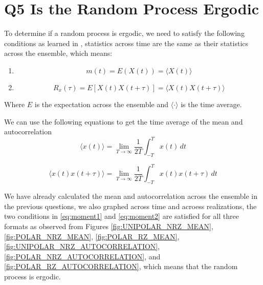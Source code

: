 \chapter[Q5 Is the Random Process Ergodic]{Q5 Is the Random Process Ergodic}
\label{cp:q5-is-the-random-process-ergodic}

To determine if a random process is ergodic, we need to satisfy the following
conditions as learned in \cite{DigitalCommunicationsLecture4}, statistics across time are the same
as their statistics across the ensemble, which means:
\begin{enumerate}
    \item \begin{equation}
              \label{eq:moment1}
              m(t) = E(X(t)) = \langle X(t) \rangle
          \end{equation}

    \item \begin{equation}
              \label{eq:moment2}
              R_x(\tau) = E[X(t) X(t + \tau)] = \langle X(t) X(t + \tau) \rangle
          \end{equation}
\end{enumerate}

Where $E$ is the expectation across the ensemble and $\langle \cdot \rangle$ is
the time average.

We can use the following equations to get the time average of the mean and
autocorrelation
\begin{equation}
    \langle x(t) \rangle = \lim_{T\to\infty} \frac{1}{2T} \int_{-T}^{T} x(t) \, dt
\end{equation}

\begin{equation}
    \langle x(t) x(t + \tau) \rangle = \lim_{T\to\infty} \frac{1}{2T} \int_{-T}^{T} x(t)x(t + \tau) \, dt
\end{equation}

We have already calculated the mean and autocorrelation across the ensemble in
the previous questions, we also graphed across time and acroess realizations,
the two conditions in \autoref{eq:moment1} and \autoref{eq:moment2} are
satisfied for all three formats as observed from Figures
\autoref{fig:UNIPOLAR_NRZ_MEAN},
\autoref{fig:POLAR_NRZ_MEAN}, 
\autoref{fig:POLAR_RZ_MEAN}, 
\autoref{fig:UNIPOLAR_NRZ_AUTOCORRELATION},
\autoref{fig:POLAR_NRZ_AUTOCORRELATION}, and
\autoref{fig:POLAR_RZ_AUTOCORRELATION}, which means that the
random process is ergodic.
